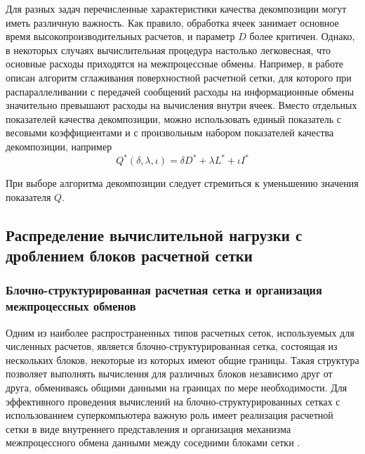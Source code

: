 Для разных задач перечисленные характеристики качества декомпозиции могут иметь различную важность.
Как правило, обработка ячеек занимает основное время высокопроизводительных расчетов, и параметр $D$ более критичен.
Однако, в некоторых случаях вычислительная процедура настолько легковесная, что основные расходы приходятся на межпроцессные обмены.
Например, в работе \cite{Tong2017Remesh} описан алгоритм сглаживания поверхностной расчетной сетки, для которого при распараллеливании с передачей сообщений расходы на информационные обмены значительно превышают расходы на вычисления внутри ячеек.
Вместо отдельных показателей качества декомпозиции, можно использовать единый показатель с весовыми коэффициентами и с произвольным набором показателей качества декомпозиции, например
\begin{equation}
	Q^{*}(\delta, \lambda, \iota) = \delta D^{*} + \lambda L^{*} + \iota I^{*}
\end{equation}

При выборе алгоритма декомпозиции следует стремиться к уменьшению значения показателя $Q$.


\subsection{Распределение вычислительной нагрузки с дроблением блоков расчетной сетки}

\subsubsection{Блочно-структурированная расчетная сетка и организация межпроцессных обменов}

Одним из наиболее распространенных типов расчетных сеток, используемых для численных расчетов, является блочно-структурированная сетка, состоящая из нескольких блоков, некоторые из которых имеют общие границы.
Такая структура позволяет выполнять вычисления для различных блоков независимо друг от друга, обмениваясь общими данными на границах по мере необходимости.
Для эффективного проведения вычислений на блочно-структурированных сетках с использованием суперкомпьютера важную роль имеет реализация расчетной сетки в виде внутреннего представления и организация механизма межпроцессного обмена данными между соседними блоками сетки \cite{Rybakov2017Mesh}.

